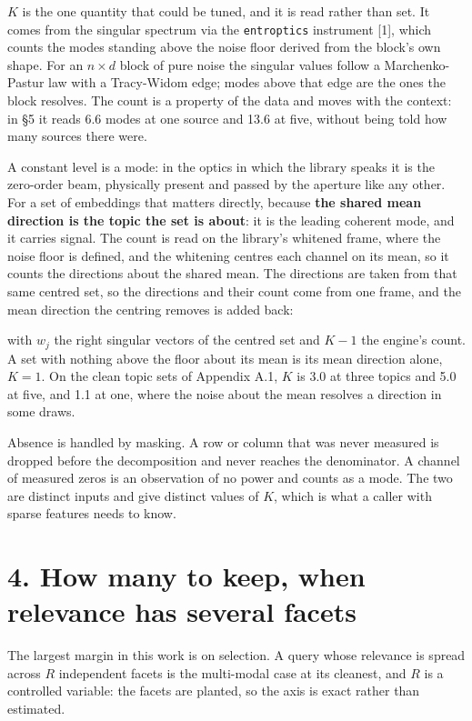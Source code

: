 \documentclass[10pt,letterpaper,twocolumn]{article}
\begin{document}
\(K\) is the one quantity that could be tuned, and it is read rather than set. It comes from the
singular spectrum via the \texttt{entroptics} instrument {[}1{]}, which counts the modes standing above the
noise floor derived from the block's own shape. For an \(n \times d\) block of pure noise the
singular values follow a Marchenko-Pastur law with a Tracy-Widom edge; modes above that edge are
the ones the block resolves. The count is a property of the data and moves with the context: in
§5 it reads 6.6 modes at one source and 13.6 at five, without being told how many sources there
were.

A constant level is a mode: in the optics in which the library speaks it is the zero-order beam,
physically present and passed by the aperture like any other. For a set of embeddings that
matters directly, because \textbf{the shared mean direction is the topic the set is about}: it is the
leading coherent mode, and it carries signal. The count is read on the library's whitened frame,
where the noise floor is defined, and the whitening centres each channel on its mean, so it
counts the directions about the shared mean. The directions are taken from that same centred
set, so the directions and their count come from one frame, and the mean direction the centring
removes is added back:


with \(w_j\) the right singular vectors of the centred set and \(K - 1\) the engine's count. A set
with nothing above the floor about its mean is its mean direction alone, \(K = 1\). On the clean
topic sets of Appendix A.1, \(K\) is 3.0 at three topics and 5.0 at five, and 1.1 at one, where
the noise about the mean resolves a direction in some draws.

Absence is handled by masking. A row or column that was never measured is dropped before the
decomposition and never reaches the denominator. A channel of measured zeros is an observation
of no power and counts as a mode. The two are distinct inputs and give distinct values of \(K\),
which is what a caller with sparse features needs to know.

\section{4. How many to keep, when relevance has several facets}\label{4-how-many-to-keep-when-relevance-has-several-facets}

The largest margin in this work is on selection. A query whose relevance is spread across \(R\)
independent facets is the multi-modal case at its cleanest, and \(R\) is a controlled variable:
the facets are planted, so the axis is exact rather than estimated.
\end{document}

